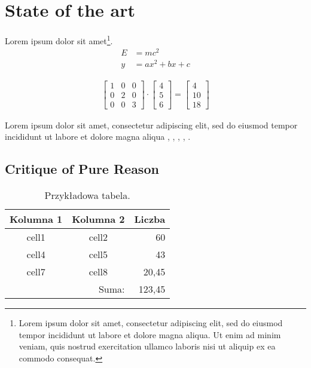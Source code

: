 \newpage %
\section{State of the art}
\lipsum[1] Lorem ipsum dolor sit amet\footnote{Lorem ipsum dolor sit amet, consectetur adipiscing elit, sed do eiusmod tempor incididunt ut labore et dolore magna aliqua. Ut enim ad minim veniam, quis nostrud exercitation ullamco laboris nisi ut aliquip ex ea commodo consequat.}.
\begin{align*}
    E & = mc^2 \\
    y & = ax^2 + bx + c
\end{align*}

\lipsum[3]

\begin{align}
\begin{bmatrix}
    1 & 0 & 0 \\
    0 & 2 & 0 \\
    0 & 0 & 3
\end{bmatrix} \cdot
\begin{bmatrix}
    4 \\ 5 \\ 6
\end{bmatrix} =
\begin{bmatrix}
    4 \\ 10 \\ 18
\end{bmatrix}
\end{align}

\lipsum[4] Lorem ipsum dolor sit amet, consectetur adipiscing elit, sed do eiusmod tempor incididunt ut labore et dolore magna aliqua \cite{szczypiorski2015}, \cite{duqu2011}, \cite{shs2015}, \cite{wozniak2018}, \cite{dcp19}.

\subsection{Critique of Pure Reason}
\kant[1]

\begin{table}[!h] \label{tab:tabela1} \centering
\caption{Przykładowa tabela.}
\begin{tabular} {| c | c | r |} \hline
    Kolumna 1 & Kolumna 2 & Liczba \\ \hline\hline
    cell1 & cell2 & 60 \\ \hline
    cell4 & cell5 & 43 \\ \hline
    cell7 & cell8 & 20,45 \\ \hline
    \multicolumn{2}{|r|}{Suma:} & 123,45 \\ \hline
\end{tabular}
\end{table}


